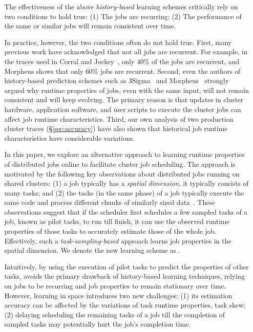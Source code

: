 The effectiveness of the above {\em history-based} learning schemes
critically rely on two conditions to hold true: 
(1) The jobs are recurring; (2) The performance of the same or
similar jobs will remain consistent over time.

In practice, however, the two conditions often do not hold true.
First, many previous work have acknowledged that not all jobs are
recurrent. For example, in the traces used in Corral \cite{corral} and
Jockey~\cite{jockey:eurosys2012}, only
40\% of the jobs are recurrent, and Morpheus \cite{morpheus} shows that
only 60\% jobs are recurrent.
%
Second, even the authors of history-based prediction schemes such as
3Sigma~\cite{3Sigma} and Morpheus~\cite{morpheus} strongly argued why
runtime properties of jobs, even with the same input, will not remain
consistent and will keep evolving. The primary reason is that updates
in cluster hardware, application software, and user scripts to execute
the cluster jobs can affect job runtime characteristics.
%
Third, our own analysis of two production cluster traces (\S\ref{sec:accuracy}) have also shown that historical job runtime
characteristics have considerable variations.

In this paper, we explore an alternative approach to learning runtime
properties of distributed jobs online to facilitate cluster
job scheduling.
%
The approach is motivated by the following key observations about
distributed jobs running on shared clusters: (1) a job typically has a
{\em spatial dimension}, \ie it typically consists of many tasks; and (2)
the tasks (in the same phase) of a job typically execute the same code
and process different chunks of similarly sized
data~\cite{googleClusterData2011-2Schema,
  personalCommunication:MarkAstley}.  These observations suggest that
if the scheduler first schedules a few sampled tasks of a job, known as
pilot tasks, to run till finish, it can use the observed runtime
properties of those tasks to accurately estimate those of the whole
job.  Effectively, such a {\em task-sampling-based} approach learns job
properties in the spatial dimension.  We denote the new learning
scheme as \slearn.

Intuitively, by using the execution of pilot tasks to predict the
properties of other tasks, \lTechnique avoids the primary drawback of
history-based learning techniques, \ie relying on jobs to be recurring
and job properties to remain stationary over time.  However, learning
in space introduces two new challenges: (1) its estimation accuracy
can be affected by the variations of task runtime properties, \ie task skew; 
(2) delaying scheduling the remaining tasks of a job till the
completion of sampled tasks may potentially hurt the job's completion
time.

